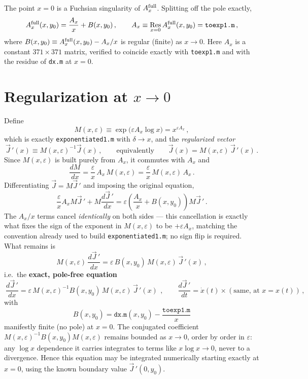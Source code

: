 \documentclass[11pt]{article}
\newcommand{\eps}{\varepsilon}
\newcommand{\Ax}{A_x}
\newcommand{\Jvec}{\vec J}
\newcommand{\Jreg}{\vec J\,'}
\begin{document}
The point $x=0$ is a Fuchsian singularity of $A_x^{\rm full}$. Splitting off the pole exactly,
\begin{equation}
A_x^{\rm full}(x,y_0) = \frac{\Ax}{x} + B(x,y_0)\,, \qquad
\Ax \equiv \operatorname*{Res}_{x=0} A_x^{\rm full}(x,y_0) = \texttt{toexp1.m}\,,
\end{equation}
where $B(x,y_0) \equiv A_x^{\rm full}(x,y_0) - \Ax/x$ is regular (finite) as $x\to0$. Here $\Ax$ is a
constant $371\times371$ matrix, verified to coincide exactly with \texttt{toexp1.m} and with the
residue of \texttt{dx.m} at $x=0$.

\section{Regularization at $x\to0$}

Define
\begin{equation}
M(x,\eps) \equiv \exp\!\big(\eps \Ax \log x\big) = x^{\eps \Ax}\,,
\end{equation}
which is exactly \texttt{exponentiated1.m} with $\delta \to x$, and the \emph{regularized vector}
\begin{equation}
\Jreg(x) \equiv M(x,\eps)^{-1}\Jvec(x)\,, \qquad\text{equivalently}\qquad \Jvec(x) = M(x,\eps)\,\Jreg(x)\,.
\end{equation}
Since $M(x,\eps)$ is built purely from $\Ax$, it commutes with $\Ax$ and
\begin{equation}
\frac{dM}{dx} = \frac{\eps}{x}\,\Ax\,M(x,\eps) = \frac{\eps}{x}\,M(x,\eps)\,\Ax\,.
\end{equation}
Differentiating $\Jvec = M\Jreg$ and imposing the original equation,
\begin{equation}
\frac{\eps}{x}\Ax M \Jreg + M\frac{d\Jreg}{dx}
= \eps\left(\frac{\Ax}{x} + B(x,y_0)\right) M \Jreg\,.
\end{equation}
The $\Ax/x$ terms cancel \emph{identically} on both sides — this cancellation is exactly what fixes
the sign of the exponent in $M(x,\eps)$ to be $+\eps \Ax$, matching the convention already used to build
\texttt{exponentiated1.m}; no sign flip is required. What remains is
\begin{equation}
M(x,\eps)\,\frac{d\Jreg}{dx} = \eps\, B(x,y_0)\, M(x,\eps)\, \Jreg(x)\,,
\end{equation}
i.e.\ the \textbf{exact, pole-free equation}
\begin{equation}
\boxed{\ \dfrac{d\Jreg}{dx} = \eps\, M(x,\eps)^{-1} B(x,y_0)\, M(x,\eps)\, \Jreg(x)\ }\,, \qquad
\frac{d\Jreg}{dt} = \dot x(t) \times (\text{same, at } x=x(t))\,,
\label{eq:regODE}
\end{equation}
with
\begin{equation}
B(x,y_0) = \texttt{dx.m}(x,y_0) - \frac{\texttt{toexp1.m}}{x}
\end{equation}
manifestly finite (no pole) at $x=0$. The conjugated coefficient $M(x,\eps)^{-1}B(x,y_0)M(x,\eps)$ remains
bounded as $x\to 0$, order by order in $\eps$: any $\log x$ dependence it carries integrates to terms
like $x\log x \to 0$, never to a divergence. Hence this equation may be integrated numerically
starting exactly at $x=0$, using the known boundary value $\Jreg(0,y_0)$.
\end{document}
